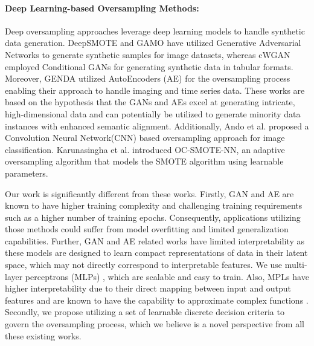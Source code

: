 \paragraph{\textbf{Deep Learning-based Oversampling Methods: }} Deep oversampling approaches leverage deep learning models to handle synthetic data generation. DeepSMOTE \cite{dablain2022deepsmote} and GAMO \cite{mullick2019generative} have utilized Generative Adversarial Networks to generate synthetic samples for image datasets, whereas cWGAN \cite{engelmann2021conditional} employed Conditional GANs for generating synthetic data in tabular formats. Moreover, GENDA \cite{troullinou2023generative} utilized AutoEncoders (AE) for the oversampling process enabling their approach to handle imaging and time series data. These works are based on the hypothesis that the GANs and AEs excel at generating intricate, high-dimensional data and can potentially be utilized to generate minority data instances with enhanced semantic alignment. Additionally,  Ando et al. \cite{ando2017deep} proposed a Convolution Neural Network(CNN) based oversampling approach for image classification. Karunasingha et al. \cite{karunasingha2023oc} introduced OC-SMOTE-NN, an adaptive oversampling algorithm that models the SMOTE  algorithm using learnable parameters.

Our work is significantly different from these works. Firstly, GAN and AE are known to have higher training complexity and challenging training requirements such as a higher number of training epochs.  Consequently, applications utilizing those methods could suffer from model overfitting and limited generalization capabilities. Further, GAN and AE related works have limited interpretability as these models are designed to learn compact representations of data in their latent space, which may not directly correspond to interpretable features.  We use multi-layer perceptrons (MLPs) \cite{murtagh1991multilayer}, which are scalable and easy to train. Also, MPLs have higher interpretability due to their direct mapping between input and output features and are known to have the capability to approximate complex functions \cite{kruse2022multi}. Secondly, we propose utilizing a set of learnable discrete decision criteria to govern the oversampling process, which we believe is a novel perspective from all these existing works.